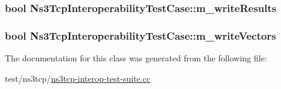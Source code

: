 \subsubsection[{\texorpdfstring{m\+\_\+write\+Results}{m_writeResults}}]{\setlength{\rightskip}{0pt plus 5cm}bool Ns3\+Tcp\+Interoperability\+Test\+Case\+::m\+\_\+write\+Results\hspace{0.3cm}{\ttfamily [private]}}\hypertarget{classNs3TcpInteroperabilityTestCase_a095b5c579d5cdee52f872718aee1cf7c}{}\label{classNs3TcpInteroperabilityTestCase_a095b5c579d5cdee52f872718aee1cf7c}
\subsubsection[{\texorpdfstring{m\+\_\+write\+Vectors}{m_writeVectors}}]{\setlength{\rightskip}{0pt plus 5cm}bool Ns3\+Tcp\+Interoperability\+Test\+Case\+::m\+\_\+write\+Vectors\hspace{0.3cm}{\ttfamily [private]}}\hypertarget{classNs3TcpInteroperabilityTestCase_a05b2ce8a52b36d9924ad9c7fda1168a9}{}\label{classNs3TcpInteroperabilityTestCase_a05b2ce8a52b36d9924ad9c7fda1168a9}


The documentation for this class was generated from the following file\+:\begin{DoxyCompactItemize}
\item 
test/ns3tcp/\hyperlink{ns3tcp-interop-test-suite_8cc}{ns3tcp-\/interop-\/test-\/suite.\+cc}\end{DoxyCompactItemize}
